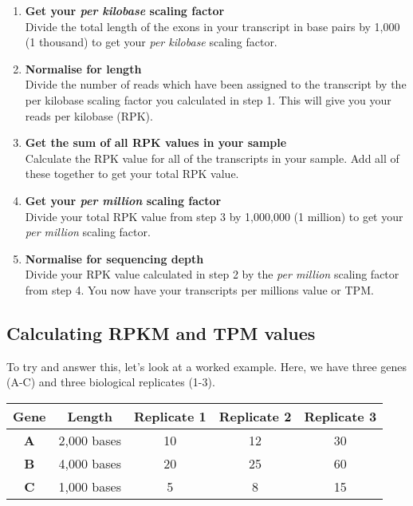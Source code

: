 \documentclass[11pt]{article}
\begin{document}
\begin{enumerate}
\def\labelenumi{\arabic{enumi}.}
\item
  \textbf{Get your \textit{per kilobase} scaling factor}\\
  Divide the total length of the exons in your transcript in base pairs
  by 1,000 (1 thousand) to get your \textit{per kilobase} scaling factor.
\item
  \textbf{Normalise for length}\\
  Divide the number of reads which have been assigned to the transcript
  by the per kilobase scaling factor you calculated in step 1. This will
  give you your reads per kilobase (RPK).
\item
  \textbf{Get the sum of all RPK values in your sample}\\
  Calculate the RPK value for all of the transcripts in your sample. Add
  all of these together to get your total RPK value.
\item
  \textbf{Get your \textit{per million} scaling factor}\\
  Divide your total RPK value from step 3 by 1,000,000 (1 million) to
  get your \textit{per million} scaling factor.
\item
  \textbf{Normalise for sequencing depth}\\
  Divide your RPK value calculated in step 2 by the \textit{per million}
  scaling factor from step 4. You now have your transcripts per millions
  value or TPM.
\end{enumerate}

\newpage

    \hypertarget{calculating-rpkm-and-tpm-values}{%
\subsection{Calculating RPKM and TPM
values}\label{calculating-rpkm-and-tpm-values}}

To try and answer this, let's look at a worked example. Here, we have
three genes (A-C) and three biological replicates (1-3).

\begin{longtable}[]{@{}ccccc@{}}
\hline
Gene & Length & Replicate 1 & Replicate 2 & Replicate 3\tabularnewline
\hline
\endhead
\textbf{A} & 2,000 bases & 10 & 12 & 30\tabularnewline
\textbf{B} & 4,000 bases & 20 & 25 & 60\tabularnewline
\textbf{C} & 1,000 bases & 5 & 8 & 15\tabularnewline
\hline
\end{longtable}
\end{document}
